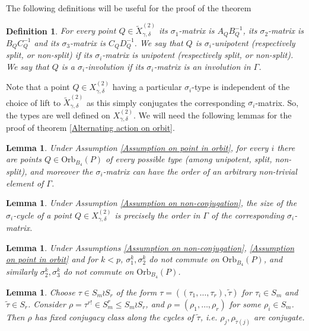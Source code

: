 \documentclass[letterpaper]{amsart}
\newtheorem{definition}[theorem]{Definition}
\newtheorem{lemma}[theorem]{Lemma}
\begin{document}
The following definitions will be useful for the proof of the theorem
\begin{definition}
For every point $Q \in \tilde{X}_{\gamma,\delta}^{(2)}$ its $\sigma_1$-matrix is $A_QB_Q^{-1}$, its $\sigma_2$-matrix is $B_QC_Q^{-1}$ and its $\sigma_3$-matrix is $C_QD_Q^{-1}$. We say that $Q$ is $\sigma_i$-unipotent (respectively split, or non-split) if its $\sigma_i$-matrix is unipotent (respectively split, or non-split). We say that $Q$ is a $\sigma_i$-involution if its $\sigma_i$-matrix is an involution in $\Gamma$.
\end{definition}
Note that a point $Q \in X_{\gamma,\delta}^{(2)}$ having a particular $\sigma_i$-type is independent of the choice of lift to $\tilde{X}_{\gamma,\delta}^{(2)}$ as this simply conjugates the corresponding $\sigma_i$-matrix. So, the types are well defined on $X_{\gamma,\delta}^{(2)}.$ We will need the following lemmas for the proof of theorem \ref{Alternating action on orbit}.
\begin{lemma}
\label{arbitrary types}
     Under Assumption \ref{Assumption on point in orbit}, for every $i$ there are points $Q \in \mathrm{Orb}_{B_4}(P)$ of every possible type (among unipotent, split, non-split), and moreover the $\sigma_i$-matrix can have the order of an arbitrary non-trivial element of $\Gamma$.
\end{lemma}
\begin{lemma}
\label{orders of sigmas}
     Under Assumption \ref{Assumption on non-conjugation}, the size of the $\sigma_i$-cycle of a point $Q \in X_{\gamma,\delta}^{(2)}$ is precisely the order in $\Gamma$ of the corresponding $\sigma_i$-matrix.
\end{lemma}
\begin{lemma}
\label{non-commutation of sigma powers}
    Under Assumptions \ref{Assumption on non-conjugation}, \ref{Assumption on point in orbit} and for $k < p$, $\sigma_1^k,\sigma_2^k$ do not commute on $\mathrm{Orb}_{B_4}(P)$, and similarly $\sigma_2^k,\sigma_3^k$ do not commute on $\mathrm{Orb}_{B_4}(P)$.
\end{lemma}
\begin{lemma}
\label{wreath product structure}
    Choose $\tau \in S_m \wr S_r$ of the form $\tau = ((\tau_1,\dots,\tau_r),\tilde{\tau})$ for $\tau_i\in S_m$ and $\tilde{\tau}\in S_r$. Consider $\rho = \tau^{r!} \in S_m^r \leq S_m \wr S_r$, and $\rho = (\rho_1,\dots,\rho_r)$ for some $\rho_i \in S_m$. Then $\rho$ has fixed conjugacy class along the cycles of $\tilde{\tau}$, i.e. $\rho_j,\rho_{\tilde{\tau}(j)}$ are conjugate.
\end{lemma}
\end{document}
